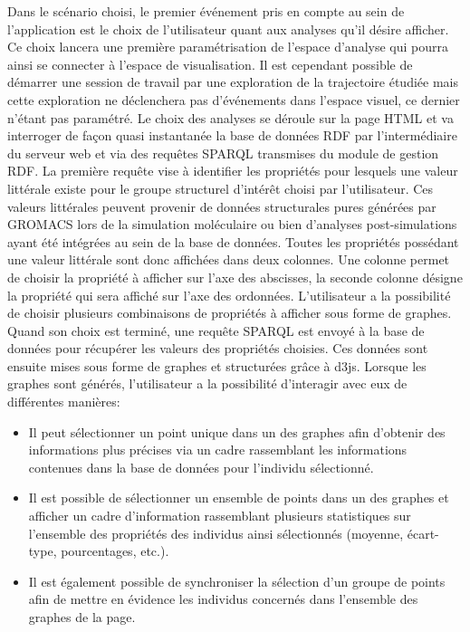 Dans le scénario choisi, le premier événement pris en compte au sein de l'application est le choix de l'utilisateur quant aux analyses qu'il désire afficher. Ce choix lancera une première paramétrisation de l'espace d'analyse qui pourra ainsi se connecter à l'espace de visualisation. 
Il est cependant possible de démarrer une session de travail par une exploration de la trajectoire étudiée mais cette exploration ne déclenchera pas d'événements dans l'espace visuel, ce dernier n'étant pas paramétré.
Le choix des analyses se déroule sur la page HTML et va interroger de façon quasi instantanée la base de données RDF par l'intermédiaire du serveur web et via des requêtes SPARQL transmises du module de gestion RDF. La première requête vise à identifier les propriétés pour lesquels une valeur littérale existe pour le groupe structurel d'intérêt choisi par l'utilisateur. Ces valeurs littérales peuvent provenir de données structurales pures générées par GROMACS lors de la simulation moléculaire ou bien d'analyses post-simulations ayant été intégrées au sein de la base de données. Toutes les propriétés possédant une valeur littérale sont donc affichées dans deux colonnes. Une colonne permet de choisir la propriété à afficher sur l'axe des abscisses, la seconde colonne désigne la propriété qui sera affiché sur l'axe des ordonnées. L'utilisateur a la possibilité de choisir plusieurs combinaisons de propriétés à afficher sous forme de graphes. Quand son choix est terminé, une requête SPARQL est envoyé à la base de données pour récupérer les valeurs des propriétés choisies. Ces données sont ensuite mises sous forme de graphes et structurées grâce à d3js.
Lorsque les graphes sont générés, l'utilisateur a la possibilité d'interagir avec eux de différentes manières: 
\begin{itemize}
	\item Il peut sélectionner un point unique dans un des graphes afin d'obtenir des informations plus précises via un cadre rassemblant les informations contenues dans la base de données pour l'individu sélectionné.
	\item Il est possible de sélectionner un ensemble de points dans un des graphes et afficher un cadre d'information rassemblant plusieurs statistiques sur l'ensemble des propriétés des individus ainsi sélectionnés (moyenne, écart-type, pourcentages, etc.).
	\item Il est également possible de synchroniser la sélection d'un groupe de points afin de mettre en évidence les individus concernés dans l'ensemble des graphes de la page.
\end{itemize}


